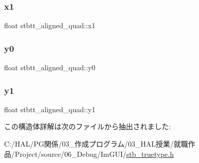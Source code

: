 \subsubsection{\texorpdfstring{x1}{x1}}
{\footnotesize\ttfamily float stbtt\+\_\+aligned\+\_\+quad\+::x1}

\mbox{\label{structstbtt__aligned__quad_a6178a6b380cf6889893afaeb5019ecd6}} 
\subsubsection{\texorpdfstring{y0}{y0}}
{\footnotesize\ttfamily float stbtt\+\_\+aligned\+\_\+quad\+::y0}

\mbox{\label{structstbtt__aligned__quad_a66ee8061da982804073a3d2a9114e53c}} 
\subsubsection{\texorpdfstring{y1}{y1}}
{\footnotesize\ttfamily float stbtt\+\_\+aligned\+\_\+quad\+::y1}



この構造体詳解は次のファイルから抽出されました\+:\begin{DoxyCompactItemize}
\item 
C\+:/\+H\+A\+L/\+P\+G関係/03\+\_\+作成プログラム/03\+\_\+\+H\+A\+L授業/就職作品/\+Project/source/06\+\_\+\+Debug/\+Im\+G\+U\+I/\mbox{\hyperlink{stb__truetype_8h}{stb\+\_\+truetype.\+h}}\end{DoxyCompactItemize}

